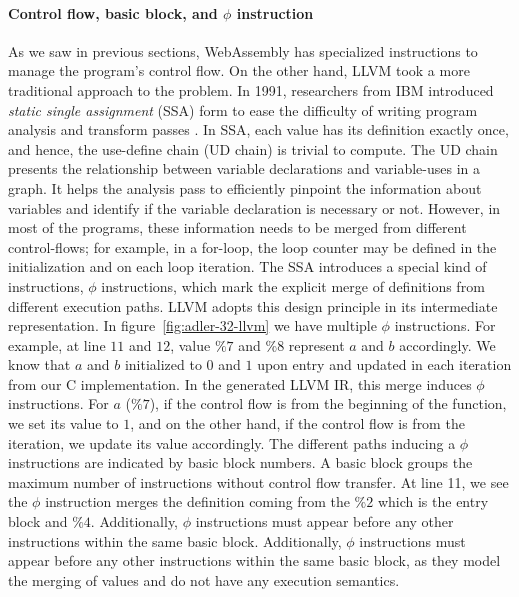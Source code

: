 \paragraph{Control flow, basic block, and $\phi$ instruction}
As we saw in previous sections, WebAssembly has specialized instructions to
manage the program's control flow. On the other hand, LLVM took a more
traditional approach to the problem. In 1991, researchers from IBM introduced
\emph{static single assignment} (SSA) form to ease the difficulty of writing
program analysis and transform passes \cite{ibm-ssa}. In SSA, each value has its
definition exactly once, and hence, the use-define chain (UD chain) is trivial
to compute. The UD chain presents the relationship between variable declarations
and variable-uses in a graph. It helps the analysis pass to efficiently pinpoint
the information about variables and identify if the variable declaration is
necessary or not. However, in most of the programs, these information needs to
be merged from different control-flows; for example, in a for-loop, the loop
counter may be defined in the initialization and on each loop iteration. The SSA
introduces a special kind of instructions, $\phi$ instructions, which mark the
explicit merge of definitions from different execution paths. LLVM adopts this
design principle in its intermediate representation. In
figure~\ref{fig:adler-32-llvm} we have multiple $\phi$ instructions. For
example, at line $11$ and $12$, value $\%7$ and $\%8$ represent $a$ and $b$
accordingly. We know that $a$ and $b$ initialized to $0$ and $1$ upon entry and
updated in each iteration from our C implementation. In the generated LLVM IR,
this merge induces $\phi$ instructions. For $a$ ($\%7$), if the control flow is
from the beginning of the function, we set its value to $1$, and on the other
hand, if the control flow is from the iteration, we update its value
accordingly. The different paths inducing a $\phi$ instructions are indicated by
basic block numbers. A basic block groups the maximum number of instructions
without control flow transfer. At line 11, we see the $\phi$ instruction merges
the definition coming from the $\%2$ which is the entry block and $\%4$.
Additionally, $\phi$ instructions must appear before any other instructions
within the same basic block. Additionally, $\phi$ instructions must appear
before any other instructions within the same basic block, as they model the
merging of values and do not have any execution semantics.

